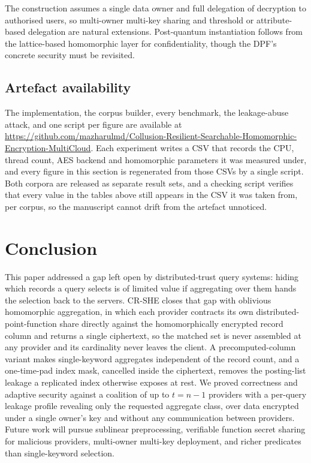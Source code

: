 \documentclass[journal]{IEEEtran}
\begin{document}
The construction assumes a single data owner and full delegation of decryption
to authorised users, so multi-owner multi-key sharing and threshold or
attribute-based delegation are natural extensions. Post-quantum instantiation
follows from the lattice-based homomorphic layer for confidentiality, though the
DPF's concrete security must be revisited.

\subsection*{Artefact availability}
The implementation, the corpus builder, every benchmark, the leakage-abuse
attack, and one script per figure are available at
\url{https://github.com/mazharulmd/Collusion-Resilient-Searchable-Homomorphic-Encryption-MultiCloud}.
Each experiment writes a CSV that records the CPU, thread count, AES backend and
homomorphic parameters it was measured under, and every figure in this section
is regenerated from those CSVs by a single script. Both corpora are released as
separate result sets, and a checking script verifies that every value in the
tables above still appears in the CSV it was taken from, per corpus, so the
manuscript cannot drift from the artefact unnoticed.

\section{Conclusion}
\label{sec:conclusion}
This paper addressed a gap left open by distributed-trust query systems: hiding which records a query selects is of limited value if aggregating over them hands the selection back to the servers. CR-SHE closes that gap with oblivious homomorphic aggregation, in which each provider contracts its own distributed-point-function share directly against the homomorphically encrypted record column and returns a single ciphertext, so the matched set is never assembled at any provider and its cardinality never leaves the client. A precomputed-column variant makes single-keyword aggregates independent of the record count, and a one-time-pad index mask, cancelled inside the ciphertext, removes the posting-list leakage a replicated index otherwise exposes at rest. We proved correctness and adaptive security against a coalition of up to $t=n-1$ providers with a per-query leakage profile revealing only the requested aggregate class, over data encrypted under a single owner's key and without any communication between providers. Future work will pursue sublinear preprocessing, verifiable function secret sharing for malicious providers, multi-owner multi-key deployment, and richer predicates than single-keyword selection.



\end{document}
